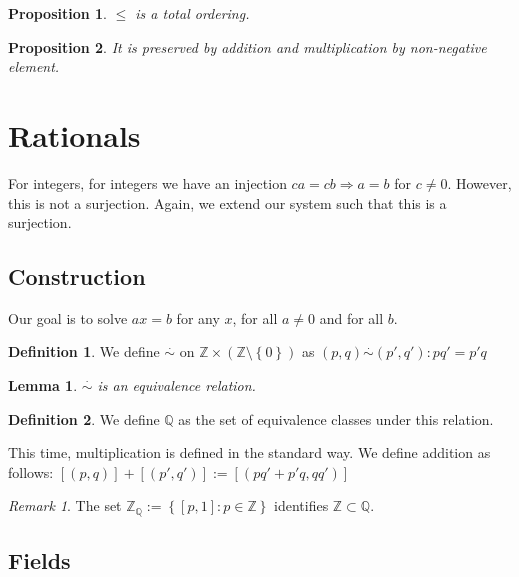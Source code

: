 \documentclass{article}
\newcommand\Z{\ensuremath{\mathbb{Z}}}
\newcommand\Q{\ensuremath{\mathbb{Q}}}
\newcommand\mr{\stackrel{\cdot}{\sim}}
\newtheorem{lemma}[theorem]{Lemma}
\theoremstyle{definition}
\newtheorem{definition}{Definition}[subsection]
\theoremstyle{remark}
\newtheorem*{remark}{Remark}
\theoremstyle{plain}
\newtheorem{prop}{Proposition}[subsection]
\begin{document}
\begin{prop}
    \(\leq\) is a total ordering.
\end{prop}

\begin{prop}
    It is preserved by addition and multiplication by non-negative element.
\end{prop}

\section{Rationals}

For integers, for integers we have an injection \(ca = cb \Rightarrow a =b\) for \(c\neq 0\). However, 
this is not a surjection. Again, we extend our system such that this is a surjection. 

\subsection{Construction}

Our goal is to solve \(ax = b\) for any \(x\), for all \(a \neq 0\) and for all \(b\).
\begin{definition}
    We define \(\mr\) on \(\Z \times (\Z \setminus \left\{ 0 \right\})\) as \((p,q) \mr (p',q'): pq' = p'q\)
\end{definition}

\begin{lemma}
    \(\mr\) is an equivalence relation.
\end{lemma}

\begin{definition}
    We define \(\Q\) as the set of equivalence classes under this relation. 
\end{definition}

This time, multiplication is defined in the standard way. We define addition as follows: \([(p,q)] + [(p',q')]:= [(pq' + p'q, qq')]\)

\begin{remark}
    The set \(\Z_{\Q} := \left\{ [p,1]: p \in \Z \right\}\) identifies \(\Z \subset \Q\).
\end{remark}

\subsection{Fields}
\end{document}
